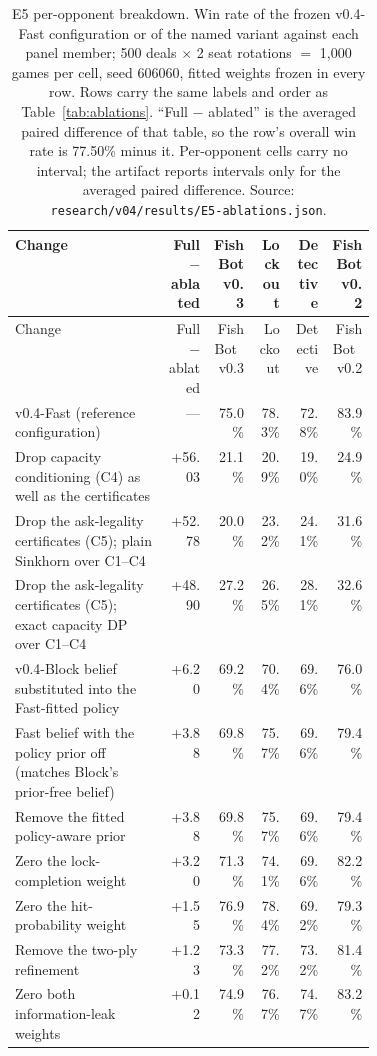 \documentclass[11pt]{article}
\theoremstyle{definition}
\DeclareRobustCommand{\vfast}{\texorpdfstring{\mbox{v0.4-Fast}}{v0.4-Fast}}
\DeclareRobustCommand{\vblock}{\texorpdfstring{\mbox{v0.4-Block}}{v0.4-Block}}
\DeclareRobustCommand{\vthree}{\texorpdfstring{\mbox{FishBot v0.3}}{FishBot v0.3}}
\DeclareRobustCommand{\vtwo}{\texorpdfstring{\mbox{FishBot v0.2}}{FishBot v0.2}}
\newcommand{\numAblRef}{77.50}
\newcommand{\numAblBlock}{+6.20}
\newcommand{\numAblPrior}{+3.88}
\newcommand{\numAblCFive}{+48.90}
\newcommand{\numAblTwoPly}{+1.23}
\newcommand{\numAblLockWeight}{+3.20}
\newcommand{\numAblGames}{1{,}000}
\newcommand{\numAblDeals}{500}
\newcommand{\numAblCFour}{+56.03}
\newcommand{\numAblSinkhorn}{+52.78}
\newcommand{\numAblLeak}{+0.12}
\newcommand{\numAblHitWeight}{+1.55}
\begin{document}
{\footnotesize
\begin{longtable}{@{}p{0.42\linewidth}rrrrr@{}}
\caption{E5 per-opponent breakdown. Win rate of the frozen \vfast{}
configuration or of the named variant against each panel member;
\numAblDeals{} deals $\times$ 2 seat rotations $=$ \numAblGames{} games per
cell, seed 606060, fitted weights frozen in every row. Rows carry the same
labels and order as Table~\ref{tab:ablations}. ``Full $-$ ablated'' is the
averaged paired difference of that table, so the row's overall win rate is
\numAblRef\% minus it. Per-opponent cells carry no interval; the artifact
reports intervals only for the averaged paired difference. Source:
\texttt{research/v04/results/E5-ablations.json}.}
\label{tab:ablopp}\\
\toprule
Change & Full $-$ ablated & \vthree{} & Lockout & Detective & \vtwo{} \\
\midrule
\endfirsthead
\toprule
Change & Full $-$ ablated & \vthree{} & Lockout & Detective & \vtwo{} \\
\midrule
\endhead
\vfast{} (reference configuration) & --- & 75.0\% & 78.3\% & 72.8\% & 83.9\% \\
\midrule
Drop capacity conditioning (C4) as well as the certificates & \numAblCFour{} & 21.1\% & 20.9\% & 19.0\% & 24.9\% \\
Drop the ask-legality certificates (C5); plain Sinkhorn over C1--C4 & \numAblSinkhorn{} & 20.0\% & 23.2\% & 24.1\% & 31.6\% \\
Drop the ask-legality certificates (C5); exact capacity DP over C1--C4 & \numAblCFive{} & 27.2\% & 26.5\% & 28.1\% & 32.6\% \\
\vblock{} belief substituted into the Fast-fitted policy & \numAblBlock{} & 69.2\% & 70.4\% & 69.6\% & 76.0\% \\
Fast belief with the policy prior off (matches Block's prior-free belief) & \numAblPrior{} & 69.8\% & 75.7\% & 69.6\% & 79.4\% \\
Remove the fitted policy-aware prior & \numAblPrior{} & 69.8\% & 75.7\% & 69.6\% & 79.4\% \\
\midrule
Zero the lock-completion weight & \numAblLockWeight{} & 71.3\% & 74.1\% & 69.6\% & 82.2\% \\
Zero the hit-probability weight & \numAblHitWeight{} & 76.9\% & 78.4\% & 69.2\% & 79.3\% \\
Remove the two-ply refinement & \numAblTwoPly{} & 73.3\% & 77.2\% & 73.2\% & 81.4\% \\
Zero both information-leak weights & \numAblLeak{} & 74.9\% & 76.7\% & 74.7\% & 83.2\% \\

\end{longtable}}
\end{document}
